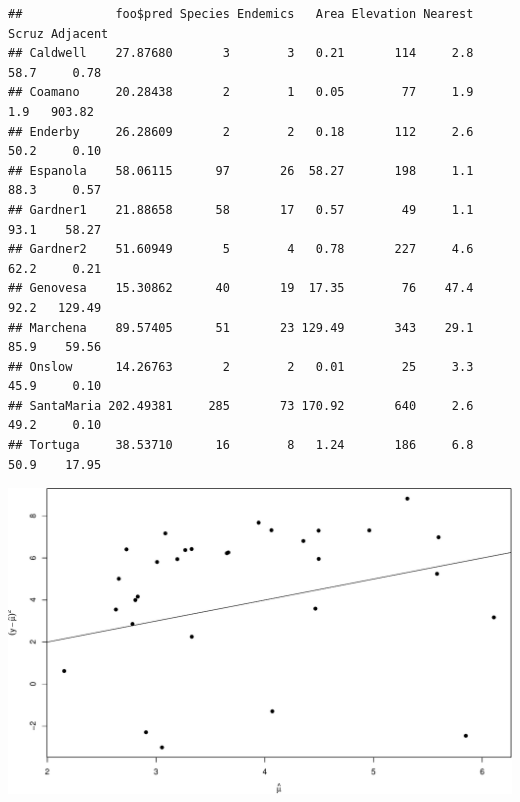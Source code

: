 \documentclass[
  ignorenonframetext,
]{beamer}
\newenvironment{Shaded}{\begin{snugshade}}{\end{snugshade}}
\newcommand{\AttributeTok}[1]{\textcolor[rgb]{0.77,0.63,0.00}{#1}}
\newcommand{\DecValTok}[1]{\textcolor[rgb]{0.00,0.00,0.81}{#1}}
\newcommand{\FunctionTok}[1]{\textcolor[rgb]{0.00,0.00,0.00}{#1}}
\newcommand{\NormalTok}[1]{#1}
\newcommand{\SpecialCharTok}[1]{\textcolor[rgb]{0.00,0.00,0.00}{#1}}
\begin{document}
\begin{frame}[fragile]{}
\begin{verbatim}
##             foo$pred Species Endemics   Area Elevation Nearest Scruz Adjacent
## Caldwell    27.87680       3        3   0.21       114     2.8  58.7     0.78
## Coamano     20.28438       2        1   0.05        77     1.9   1.9   903.82
## Enderby     26.28609       2        2   0.18       112     2.6  50.2     0.10
## Espanola    58.06115      97       26  58.27       198     1.1  88.3     0.57
## Gardner1    21.88658      58       17   0.57        49     1.1  93.1    58.27
## Gardner2    51.60949       5        4   0.78       227     4.6  62.2     0.21
## Genovesa    15.30862      40       19  17.35        76    47.4  92.2   129.49
## Marchena    89.57405      51       23 129.49       343    29.1  85.9    59.56
## Onslow      14.26763       2        2   0.01        25     3.3  45.9     0.10
## SantaMaria 202.49381     285       73 170.92       640     2.6  49.2     0.10
## Tortuga     38.53710      16        8   1.24       186     6.8  50.9    17.95
\end{verbatim}
\end{frame}

\begin{frame}[fragile]{}
\protect\hypertarget{section-27}{}
\vspace{12pt}
\tiny

\begin{Shaded}
\end{Shaded}

\includegraphics{week4_p2_files/figure-beamer/unnamed-chunk-27-1.pdf}
\end{frame}
\end{document}
